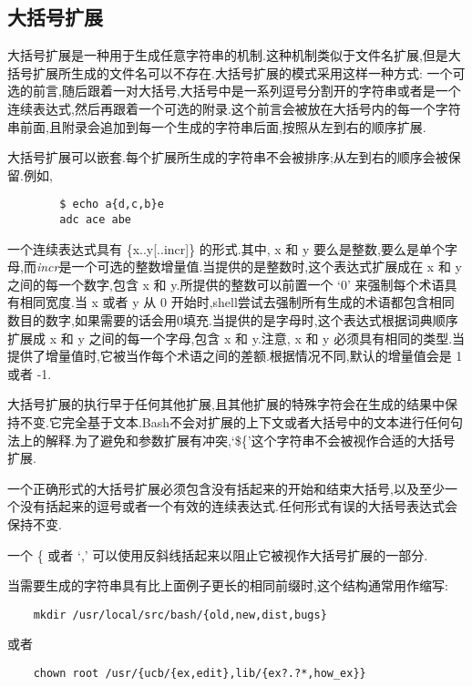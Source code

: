 \documentclass[draft,openany]{book}
\begin{document}
\begin{CJK}{UTF8}{gbsn}
    \subsection{大括号扩展}
    大括号扩展是一种用于生成任意字符串的机制.这种机制类似于文件名扩展,但是大括号扩展所生成的文件名可以不存在.大括号扩展的模式采用这样一种方式: 一个可选的前言,随后跟着一对大括号,大括号中是一系列逗号分割开的字符串或者是一个连续表达式,然后再跟着一个可选的附录.这个前言会被放在大括号内的每一个字符串前面,且附录会追加到每一个生成的字符串后面,按照从左到右的顺序扩展.\par
    大括号扩展可以嵌套.每个扩展所生成的字符串不会被排序;从左到右的顺序会被保留.例如,
    \begin{verbatim}
        $ echo a{d,c,b}e
        adc ace abe
    \end{verbatim}
    一个连续表达式具有 \{x..y[..incr]\} 的形式.其中, x 和 y 要么是整数,要么是单个字母,而\emph{incr}是一个可选的整数增量值.当提供的是整数时,这个表达式扩展成在 x 和 y 之间的每一个数字,包含 x 和 y.所提供的整数可以前置一个 `0' 来强制每个术语具有相同宽度.当 x 或者 y 从 0 开始时,shell尝试去强制所有生成的术语都包含相同数目的数字,如果需要的话会用0填充.当提供的是字母时,这个表达式根据词典顺序扩展成 x 和 y 之间的每一个字母,包含 x 和 y.注意, x 和 y 必须具有相同的类型.当提供了增量值时,它被当作每个术语之间的差额.根据情况不同,默认的增量值会是 1 或者 -1.\par
    大括号扩展的执行早于任何其他扩展,且其他扩展的特殊字符会在生成的结果中保持不变.它完全基于文本.Bash不会对扩展的上下文或者大括号中的文本进行任何句法上的解释.为了避免和参数扩展有冲突,`\$\{'这个字符串不会被视作合适的大括号扩展.\par
    一个正确形式的大括号扩展必须包含没有括起来的开始和结束大括号,以及至少一个没有括起来的逗号或者一个有效的连续表达式.任何形式有误的大括号表达式会保持不变.\par
    一个 \{ 或者 `,' 可以使用反斜线括起来以阻止它被视作大括号扩展的一部分.\par
    当需要生成的字符串具有比上面例子更长的相同前缀时,这个结构通常用作缩写:
    \begin{verbatim}
    mkdir /usr/local/src/bash/{old,new,dist,bugs}
    \end{verbatim}
    或者
    \begin{verbatim}
    chown root /usr/{ucb/{ex,edit},lib/{ex?.?*,how_ex}}
    \end{verbatim}


\end{CJK}
\end{document}
